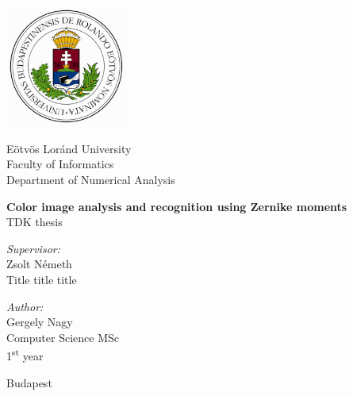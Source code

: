 \documentclass[runningheads,a4paper,11pt]{report}
\begin{document}


\begin{titlepage}
  \noindent
  \begin{minipage}{0.25 \textwidth}
    \includegraphics[height=40mm]{figures/cimer.png}
  \end{minipage}
  \hfill
  \begin{minipage}{0.67 \textwidth}
    \large
    Eötvös Loránd University \\
    Faculty of Informatics \\
    Department of Numerical Analysis \\
    
  \end{minipage}

  \vfill

  \begin{center}
    {\LARGE \bfseries Color image analysis and recognition using Zernike moments} 
    \\[2.0cm]
    {\Large TDK thesis}
    \\[3cm]
    \begin{minipage}[t]{0.45 \textwidth}
      \emph{Supervisor:} \\[0.25 \baselineskip]
      {\large Zsolt Németh} \\[0.5 \baselineskip]
      Title title title
    \end{minipage}
    \begin{minipage}[t]{0.45 \textwidth}
      \begin{flushright}
        \emph{Author:} \\[0.25 \baselineskip]
        {\large Gergely Nagy} \\[0.5 \baselineskip]
        Computer Science MSc \\ %
        1\textsuperscript{st} year
      \end{flushright}
    \end{minipage}
  \end{center}

  \vfill

  \begin{center}
    \large Budapest

  \end{center}
\end{titlepage}
\end{document}
